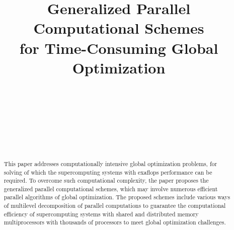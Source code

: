 \documentclass[
11pt,%
tightenlines,%
twoside,%
onecolumn,%
nofloats,%
nobibnotes,%
nofootinbib,%
superscriptaddress,%
noshowpacs,%
centertags]%
{revtex4}
\begin{document}

\title{Generalized Parallel Computational Schemes\\
for Time-Consuming Global Optimization}

\author{~}

\author{~}

\author{~}

\author{~}


\received{}

\begin{abstract}
This paper addresses computationally intensive global optimization problems, for solving of which the supercomputing systems with exaflops performance can be required. To overcome such computational complexity, the paper proposes the generalized parallel computational schemes, which may involve numerous efficient parallel algorithms of global optimization. The proposed schemes include various ways of multilevel decomposition of parallel computations to guarantee the computational efficiency of supercomputing systems with shared and distributed memory multiprocessors with thousands of processors to meet global optimization challenges.
\end{abstract}



\maketitle
\end{document}
